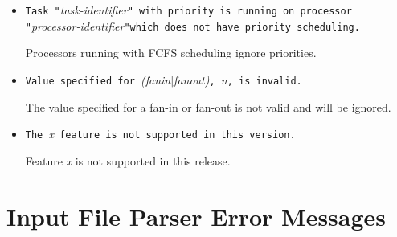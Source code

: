 \begin{itemize}
\item \texttt{Task "}\emph{task-identifier}\texttt{" with priority is
    running on processor
    "}\emph{processor-identifier}\texttt{"}\linebreak[3] \texttt{which
    does not have priority scheduling.}
  
  Processors running with FCFS scheduling
  ignore priorities.

\item \texttt{Value specified for }\emph{(fanin$|$fanout)}\texttt{,
  }\emph{n}\texttt{, is invalid.}
  
  The value specified for a fan-in or
  fan-out is not valid and will be ignored.

\item \texttt{The }\emph{x}\texttt{ feature is not supported in this version.}

  Feature \emph{x} is not supported in this release.

\end{itemize}

\section{Input File Parser Error Messages}


